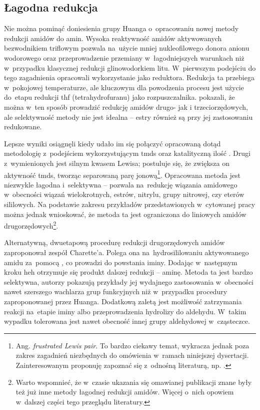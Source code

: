 
\subsection{Łagodna redukcja}
Nie można pominąć doniesienia grupy Huanga o~opracowaniu nowej metody redukcji amidów do amin.
Wysoka reaktywność amidów aktywowanych bezwodnikiem triflowym pozwala na~użycie mniej nukleofilowego donora anionu wodorowego oraz
przeprowadzenie przemiany w~łagodniejszych warunkach niż w~przypadku klasycznej redukcji glinowodorkiem litu.
W~pierwszym podejściu do tego zagadnienia opracowali wykorzystanie  jako reduktora.
Redukcja ta przebiega w~pokojowej temperaturze, ale
  kluczowym dla powodzenia procesu jest użycie do~etapu redukcji \acrshort{thf} (tetrahydrofuranu) jako rozpuszczalnika.
\citeauthor{xiang10} pokazali, że można w~ten sposób prowadzić redukcję amidów drugo- jak i trzeciorzędowych,
  ale selektywność metody nie jest idealna \--- estry również są przy jej zastosowaniu redukowane\autocite{xiang10}.

Lepsze wyniki osiągnęli \citeauthor{huang16b} kiedy udało im się połączyć\autocite{huang16b} opracowaną dotąd metodologię 
  z~podejściem wykorzystującym \gls{tmds} oraz katalityczną ilość \autocite{tan09, chadwick14, blondiaux14}.
Drugi z~wymienionych jest silnym kwasem Lewisa; postuluje się, że zwiększa on aktywność \gls{tmds},
  tworząc separowaną parę jonową\footnote{%
    Ang. \emph{frustrated Lewis pair}. To bardzo ciekawy temat,
    wykracza jednak poza zakres zagadnień niezbędnych do omówienia w~ramach niniejszej dysertacji.
    Zainteresowanym proponuję zapoznać się z~odnośną literaturą, np. \cite{stephan15}.%
  }.
Opracowana metoda jest niezwykle łagodna i~selektywna \--- pozwala na~redukcję wiązania amidowego
  w~obecności wiązań wielokrotnych, estrów, nitrylu, grupy nitrowej, czy eterów sililowych.
Na podstawie zakresu przykładów przedstawionych w~cytowanej pracy można jednak wnioskować,
  że metoda ta jest ograniczona do liniowych amidów drugorzędowych\footnote{%
    Warto wspomnieć, że w~czasie ukazania się omawianej publikacji znane były też już inne metody łagodnej redukcji amidów.
    Więcej o~nich opowiem w~dalszej części tego przeglądu literatury.
  }.

Alternatywną, dwuetapową procedurę redukcji drugorzędowych amidów zaproponował zespół Charette'a.
Polega ona na~hydrosililowaniu aktywowanego amidu za~pomocą , co prowadzi do powstania iminy.
Dodając w~następnym kroku \gls{heh} otrzymuje się produkt dalszej redukcji \--- aminę.
Metoda ta jest bardzo selektywna, autorzy pokazują przykłady jej wydajnego zastosowania w~obecności nawet szerszego wachlarza
  grup funkcyjnych niż w~przypadku procedury zaproponowanej przez Huanga.
Dodatkową zaletą jest możliwość zatrzymania reakcji na~etapie iminy albo przeprowadzenia hydrolizy do aldehydu.
W~takim wypadku tolerowana jest nawet obecność innej grupy aldehydowej w~cząsteczce\autocite{charette10}.

